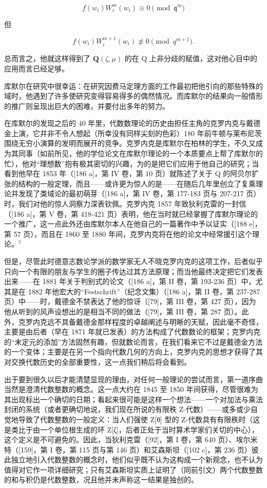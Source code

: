 \[
f (w _ {i}) W _ {i} ^ {m} (w _ {i}) \equiv 0 \pmod {\mathfrak {q} ^ {m}}
\]

但

\[
f (w _ {i}) W _ {i} ^ {m + 1} (w _ {i}) \not \equiv 0 \pmod {q ^ {m + 1}}.
\]

总而言之，他就这样得到了 \(\mathbf{Q}(\zeta,\mu)\) 的在 Q 上非分歧的赋值，这对他心目中的应用而言已经足够。

库默尔在研究中很幸运：在研究因费马定理方面的工作最初把他引向的那些特殊的域时，他遇到了许多使研究变得容易得多的偶然情况。而库默尔的结果向一般情形的推广则呈现出巨大的困难，并要付出多年的努力。

在库默尔的发现之后的 40 年里，代数数理论的历史由担任主角的克罗内克与戴德金上演，它并非不令人想起（所幸没有同样尖刻的色彩）180 年前牛顿与莱布尼茨围绕无穷小演算的发明而展开的竞争。克罗内克是库默尔在柏林的学生，不久又成为其同事（如前所见，他的学位论文在库默尔理论的一个本质要点上帮了库默尔的忙），他对“理想数”抱有极其密切的兴趣，为的是把它们应用于他自己的研究；当看到他早在 1853 年（{[}186 a{]}，第 IV 卷，第 10 页）就陈述了关于 Q 的阿贝尔扩张的结构的一般定理，而且——或许更为惊人的是——在随后几年里创立了复乘理论并发现了类域论的最初萌芽（{[}186 a{]}，第 IV 卷，第 177-183 页与 207-217 页）时，我们对他的惊人洞察力深表钦佩。克罗内克 1857 年致狄利克雷的一封信（{[}186 a{]}，第 V 卷，第 418-421 页）表明，他在当时就已经掌握了库默尔理论的一个推广，这一点此外还由库默尔本人在他自己的一篇著作中予以证实（{[}188 e{]}，第 57 页），而且在 1860 至 1880 年间，克罗内克将在他的论文中经常援引这个理论。\(^{7}\)

但是，尽管此时德意志数论学派的数学家无人不晓克罗内克的这项工作，后者似乎只向一个有限的朋友与学生的圈子传达过其方法原理；而当他最终决定把它们发表出来——在 1881 年关于判别式的论文（{[}186 a{]}，第 II 卷，第 193-236 页）中，尤其是在 1882 年他宏大的“Festschrift”（纪念文集）（{[}186 a{]}，第 II 卷，第 237-287 页）中——时，戴德金不禁表达了他的惊讶（{[}79{]}，第 III 卷，第 427 页），因为他从听到的风声设想出的是相当不同的做法（{[}79{]}，第 III 卷，第 287 页）。此外，克罗内克远不具备戴德金那样程度的卓越阐述与明晰的天赋，因此毫不奇怪，主要是由后者（早在 1871 年就已发表）的方法构成了代数数论的框架；克罗内克的“未定元的添加”方法固然有趣，但就数论而言，在我们看来它不过是戴德金方法的一个变体；主要是在另一个指向代数几何的方向上，克罗内克的思想才获得了其对交换代数历史的全部重要性，这一点我们稍后将会看到。

出于要到很久以后才能清楚显现的理由，对任何一般理论的尝试而言，第一道序曲当然是澄清代数整数的概念。这一点大约在 1845 至 1850 年间获得，尽管很难为其出现标出一个确切的日期；看起来很可能是这样一个想法——一个对加法与乘法封闭的系统（或者更确切地说，我们现在所说的有限秩 Z-代数）——或多或少自觉地导致了代数整数的一般定义：当人们强使 Z{[}θ{]} 型的 Z-代数具有有限秩时（这是类比于由一个单位根生成的环 Z{[}ζ{]}，后者正处于当时算术学家们关切的中心），这个定义是不可避免的。因此，当狄利克雷（{[}92{]}，第 I 卷，第 640 页）、埃尔米特（{[}159{]}，第 I 卷，第 115 页与第 146 页）和艾森斯坦（{[}102 c{]}，第 236 页）彼此独立地引入代数整数的概念时，他们似乎既不认为这构成一个新观念，也不认为值得对它作一项详细研究；只有艾森斯坦实质上证明了（同前引文）两个代数整数的和与积仍是代数整数，况且他并未声称这一结果是独创的。

